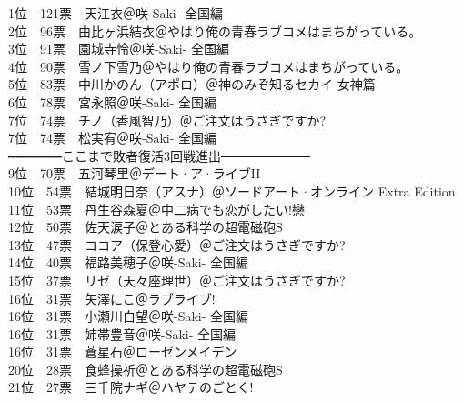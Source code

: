 {    1位　121票　天江衣＠咲-Saki- 全国編                                       \\
    2位　96票　由比ヶ浜結衣＠やはり俺の青春ラブコメはまちがっている。         \\
    3位　91票　園城寺怜＠咲-Saki- 全国編                                      \\
    4位　90票　雪ノ下雪乃＠やはり俺の青春ラブコメはまちがっている。           \\
    5位　83票　中川かのん（アポロ）＠神のみぞ知るセカイ 女神篇                \\
    6位　78票　宮永照＠咲-Saki- 全国編                                        \\
    7位　74票　チノ（香風智乃）＠ご注文はうさぎですか?                        \\
    7位　74票　松実宥＠咲-Saki- 全国編                                        \\
    ━━━━━━━ここまで敗者復活3回戦進出━━━━━━━                     \\
    9位　70票　五河琴里＠デート·ア·ライブII                                 \\
    10位　54票　結城明日奈（アスナ）＠ソードアート·オンライン Extra Edition  \\
    11位　53票　丹生谷森夏＠中二病でも恋がしたい!戀                           \\
    12位　50票　佐天涙子＠とある科学の超電磁砲S                               \\
    13位　47票　ココア（保登心愛）＠ご注文はうさぎですか?                     \\
    14位　40票　福路美穂子＠咲-Saki- 全国編                                   \\
    15位　37票　リゼ（天々座理世）＠ご注文はうさぎですか?                     \\
    16位　31票　矢澤にこ＠ラブライブ!                                         \\
    16位　31票　小瀬川白望＠咲-Saki- 全国編                                   \\
    16位　31票　姉帯豊音＠咲-Saki- 全国編                                     \\
    16位　31票　蒼星石＠ローゼンメイデン                                      \\
    20位　28票　食蜂操祈＠とある科学の超電磁砲S                               \\
    21位　27票　三千院ナギ＠ハヤテのごとく!                                   \\
}
